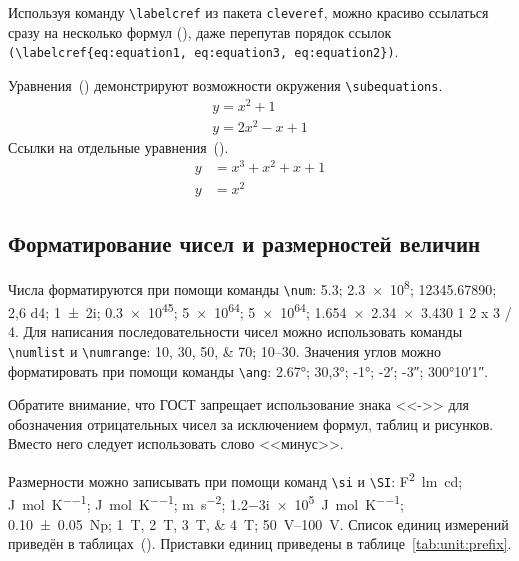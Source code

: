 Используя команду \verb|\labelcref| из пакета \verb|cleveref|, можно
красиво ссылаться сразу на несколько формул
(), даже перепутав
порядок ссылок \verb|(\labelcref{eq:equation1, eq:equation3, eq:equation2})|.

Уравнения~() демонстрируют возможности
окружения \verb|\subequations|.
\begin{subequations}
	\label{eq:subeq_1}
	\begin{gather}
		y = x^2 + 1 \label{eq:subeq_1-1} \\
		y = 2 x^2 - x + 1 \label{eq:subeq_1-2}
	\end{gather}
\end{subequations}
Ссылки на отдельные уравнения~().
\begin{subequations}
	\label{eq:subeq_2}
	\begin{align}
		y &= x^3 + x^2 + x + 1 \label{eq:subeq_2-1} \\
		y &= x^2
	\end{align}
\end{subequations}

\subsection{Форматирование чисел и размерностей величин}\label{sec:units}

Числа форматируются при помощи команды \verb|\num|:
\num{5,3};
\num{2,3e8};
\num{12345,67890};
\num{2,6 d4};
\num{1+-2i};
\num{.3e45};
\num[exponent-base=2]{5 e64};
\num[exponent-base=2,exponent-to-prefix]{5 e64};
\num{1.654 x 2.34 x 3.430}
\num{1 2 x 3 / 4}.
Для написания последовательности чисел можно использовать команды \verb|\numlist| и \verb|\numrange|:
\numlist{10;30;50;70}; \numrange{10}{30}.
Значения углов можно форматировать при помощи команды \verb|\ang|:
\ang{2.67};
\ang{30,3};
\ang{-1;;};
\ang{;-2;};
\ang{;;-3};
\ang{300;10;1}.

Обратите внимание, что ГОСТ запрещает использование знака <<->> для обозначения отрицательных чисел
за исключением формул, таблиц и рисунков.
Вместо него следует использовать слово <<минус>>.

Размерности можно записывать при помощи команд \verb|\si| и \verb|\SI|:
\si{\farad\squared\lumen\candela};
\si{\joule\per\mole\per\kelvin};
\si[per-mode = symbol-or-fraction]{\joule\per\mole\per\kelvin};
\si{\metre\per\second\squared};
\SI{1.2-3i e5}{\joule\per\mole\per\kelvin};
\SI{0.10(5)}{\neper};
\SIlist{1;2;3;4}{\tesla};
\SIrange{50}{100}{\volt}.
Список единиц измерений приведён в таблицах~().
Приставки единиц приведены в таблице~\ref{tab:unit:prefix}.

